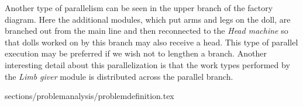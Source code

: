Another type of parallelism can be seen in the upper branch of the factory diagram. Here the additional modules, which put arms and legs on the doll, are branched out from the main line and then reconnected to the \textit{Head machine} so that dolls worked on by this branch may also receive a head. This type of parallel execution may be preferred if we wish not to lengthen a branch. Another interesting detail about this parallelization is that the work types performed by the \textit{Limb giver} module is distributed across the parallel branch. 

 {sections/problemanalysis/problemdefinition.tex}

